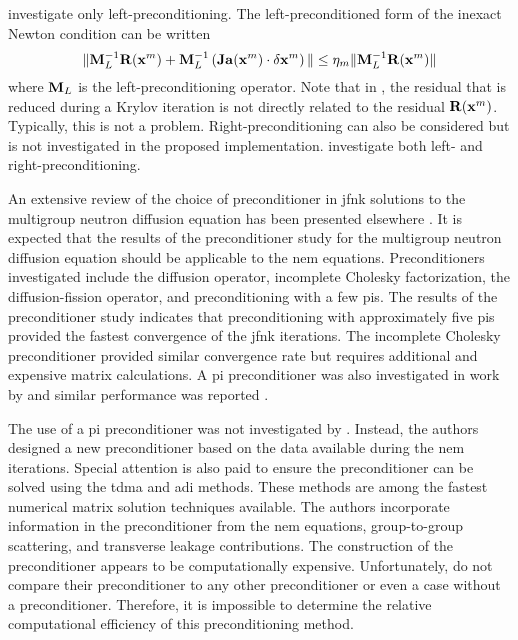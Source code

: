     \citeauthor{qe2paper} investigate only left-preconditioning. The 
    left-preconditioned form of the inexact Newton condition can be written
    \begin{equation}
      \label{eq:left_precondition}
      \| \mathbf{M}_L^{-1} \mathbf{R}(\mathbf{x}^m) + \mathbf{M}_L^{-1} \left( \mathbf{Ja}(\mathbf{x}^m)
        \cdot \delta\mathbf{x}^m \right) \| \le \eta_m \| \mathbf{M}_L^{-1} \mathbf{R}(\mathbf{x}^m) \|
    \end{equation}
    where $\mathbf{M}_L$ is the left-preconditioning operator. Note that in
    , the residual that is reduced during a Krylov
    iteration is not directly related to the residual $\mathbf{R}(\mathbf{x}^m)$.
    Typically, this is not a problem. Right-preconditioning can also be
    considered but is not investigated in the proposed implementation.
    \citeauthor{gill_azmy} investigate both left- and right-preconditioning.

    An extensive review of the choice of preconditioner in \gls{jfnk}
    solutions to the multigroup neutron diffusion equation has been presented
    elsewhere \cite{gill_azmy}. It is expected that the results of the
    preconditioner study for the multigroup neutron diffusion equation should
    be applicable to the \gls{nem} equations. Preconditioners investigated
    include the diffusion operator, incomplete Cholesky factorization, the
    diffusion-fission operator, and preconditioning with a few \glspl{pi}. The
    results of the preconditioner study indicates that preconditioning with
    approximately five \glspl{pi} provided the fastest convergence of the
    \gls{jfnk} iterations. The incomplete Cholesky preconditioner provided
    similar convergence rate but requires additional and expensive matrix
    calculations. A \gls{pi} preconditioner was also investigated in work by
    \citeauthor{jfnk_wielandt} and similar performance was reported
    \cite{jfnk_wielandt}.

    The use of a \gls{pi} preconditioner was not investigated by
    \citeauthor{qe2paper}. Instead, the authors designed a new preconditioner
    based on the data available during the \gls{nem} iterations. Special
    attention is also paid to ensure the preconditioner can be solved using
    the \gls{tdma} and \gls{adi} methods. These methods are among the fastest
    numerical matrix solution techniques available. The authors incorporate
    information in the preconditioner from the \gls{nem} equations,
    group-to-group scattering, and transverse leakage contributions. The
    construction of the preconditioner appears to be computationally
    expensive. Unfortunately, \citeauthor{qe2paper} do not compare their
    preconditioner to any other preconditioner or even a case without a
    preconditioner. Therefore, it is impossible to determine the relative
    computational efficiency of this preconditioning method.


